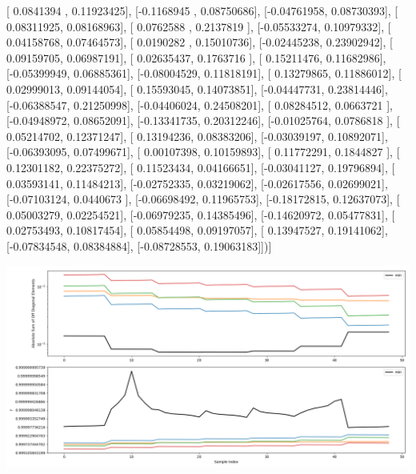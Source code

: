 \documentclass{article}
\begin{document}
       [ 0.0841394 ,  0.11923425],
       [-0.1168945 ,  0.08750686],
       [-0.04761958,  0.08730393],
       [ 0.08311925,  0.08168963],
       [ 0.0762588 ,  0.2137819 ],
       [-0.05533274,  0.10979332],
       [ 0.04158768,  0.07464573],
       [ 0.0190282 ,  0.15010736],
       [-0.02445238,  0.23902942],
       [ 0.09159705,  0.06987191],
       [ 0.02635437,  0.1763716 ],
       [ 0.15211476,  0.11682986],
       [-0.05399949,  0.06885361],
       [-0.08004529,  0.11818191],
       [ 0.13279865,  0.11886012],
       [ 0.02999013,  0.09144054],
       [ 0.15593045,  0.14073851],
       [-0.04447731,  0.23814446],
       [-0.06388547,  0.21250998],
       [-0.04406024,  0.24508201],
       [ 0.08284512,  0.0663721 ],
       [-0.04948972,  0.08652091],
       [-0.13341735,  0.20312246],
       [-0.01025764,  0.0786818 ],
       [ 0.05214702,  0.12371247],
       [ 0.13194236,  0.08383206],
       [-0.03039197,  0.10892071],
       [-0.06393095,  0.07499671],
       [ 0.00107398,  0.10159893],
       [ 0.11772291,  0.1844827 ],
       [ 0.12301182,  0.22375272],
       [ 0.11523434,  0.04166651],
       [-0.03041127,  0.19796894],
       [ 0.03593141,  0.11484213],
       [-0.02752335,  0.03219062],
       [-0.02617556,  0.02699021],
       [-0.07103124,  0.0440673 ],
       [-0.06698492,  0.11965753],
       [-0.18172815,  0.12637073],
       [ 0.05003279,  0.02254521],
       [-0.06979235,  0.14385496],
       [-0.14620972,  0.05477831],
       [ 0.02753493,  0.10817454],
       [ 0.05854498,  0.09197057],
       [ 0.13947527,  0.19141062],
       [-0.07834548,  0.08384884],
       [-0.08728553,  0.19063183]])]
\begin{center}
\includegraphics[scale=.9]{report_pickled_controls137/control_dpn_all.png}

\end{center}
\end{document}
